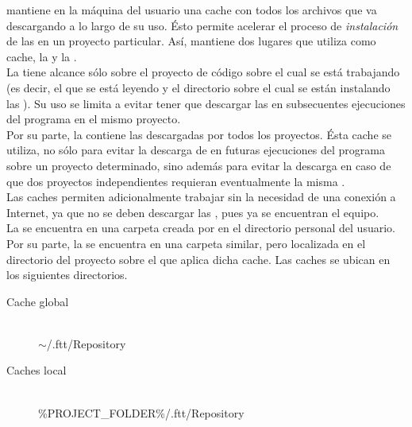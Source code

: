 \fronttier mantiene en la máquina del usuario una cache con todos los archivos 
que va descargando a lo largo de su uso. Ésto permite acelerar el proceso de 
\emph{instalación} de las \dependencies en un proyecto particular. Así, 
\fronttier mantiene dos lugares que utiliza como cache, la \cachel y la 
\cacheg.\\
La \cachel tiene alcance sólo sobre el proyecto de código sobre el cual se está 
trabajando (es decir, el \conffile que se está leyendo y el directorio sobre el 
cual se están instalando las \dependencies). Su uso se limita a evitar tener 
que descargar las \dependencies en subsecuentes ejecuciones del programa en el 
mismo proyecto.\\
Por su parte, la \cacheg contiene las \dependencies descargadas por todos los 
proyectos. Ésta cache se utiliza, no sólo para evitar la descarga de 
\dependencies en futuras ejecuciones del programa sobre un proyecto 
determinado, sino además para evitar la descarga en caso de que dos proyectos 
independientes requieran eventualmente la misma \dependency.\\
Las caches permiten adicionalmente trabajar sin la necesidad de una conexión a 
Internet, ya que no se deben descargar las \dependencies, pues ya se encuentran 
el equipo.\\
La \cacheg se encuentra en una carpeta creada por \fronttier en el directorio 
personal del usuario. Por su parte, la \cachel se encuentra en una carpeta 
similar, pero localizada en el directorio del proyecto sobre el que aplica 
dicha cache. Las caches se ubican en los siguientes directorios.

\begin{description}
	\item[Cache global] \hfill \\
	$\sim$/.ftt/Repository
	\item[Caches local] \hfill \\
	\%PROJECT\_FOLDER\%/.ftt/Repository
\end{description}

